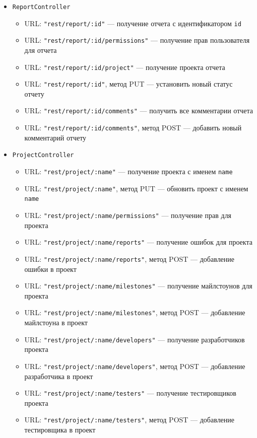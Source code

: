 \begin{itemize}
		\item \texttt{ReportController}
		\begin{itemize}
			\item URL: \texttt{"rest/report/:id"} --- получение отчета с идентификатором \texttt{id}
			\item URL: \texttt{"rest/report/:id/permissions"} --- получение прав пользователя для отчета
			\item URL: \texttt{"rest/report/:id/project"} --- получение проекта отчета
			\item URL: \texttt{"rest/report/:id"}, метод PUT --- установить новый статус отчету
			\item URL: \texttt{"rest/report/:id/comments"} --- получить все комментарии отчета
			\item URL: \texttt{"rest/report/:id/comments"}, метод POST --- добавить новый комментарий отчету
		\end{itemize}
		
		\item \texttt{ProjectController}
		\begin{itemize}
			\item URL: \texttt{"rest/project/:name"} --- получение проекта с именем \texttt{name}
			\item URL: \texttt{"rest/project/:name"}, метод PUT --- обновить проект с именем \texttt{name}
			\item URL: \texttt{"rest/project/:name/permissions"} --- получение прав для проекта
			\item URL: \texttt{"rest/project/:name/reports"} --- получение ошибок для проекта
			\item URL: \texttt{"rest/project/:name/reports"}, метод POST --- добавление ошибки в проект
			\item URL: \texttt{"rest/project/:name/milestones"} --- получение майлстоунов для проекта
			\item URL: \texttt{"rest/project/:name/milestones"}, метод POST --- добавление майлстоуна в проект
			\item URL: \texttt{"rest/project/:name/developers"} --- получение разработчиков проекта
			\item URL: \texttt{"rest/project/:name/developers"}, метод POST --- добавление разработчика в проект
			\item URL: \texttt{"rest/project/:name/testers"} --- получение тестировщиков проекта
			\item URL: \texttt{"rest/project/:name/testers"}, метод POST --- добавление тестировщика в проект
		\end{itemize}
		

\end{itemize}
